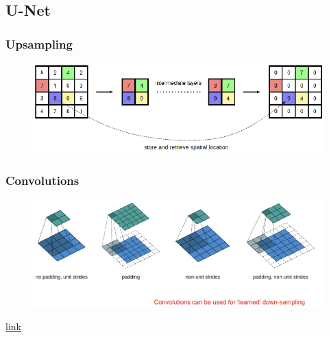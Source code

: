 \documentclass[11pt]{article}
\begin{document}
\subsection{U-Net}

\begin{figure}[H]
    \centering
\end{figure}

\subsubsection{Upsampling}\label{sect:upsample}

\begin{figure}[H]
    \centering
    \includegraphics[width=.8\linewidth]{figures/upsampling.png}
    \caption{}
\end{figure}

\subsubsection{Convolutions}

\begin{figure}[H]
    \centering
    \includegraphics[width=.8\linewidth]{figures/convolutions.png}
\end{figure}

\href{https://github.com/vdumoulin/conv_arithmetic}{link}
\end{document}
